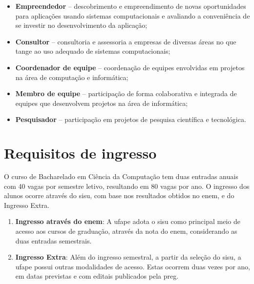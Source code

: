 \documentclass[
	12pt,				%
	openright,			%
  oneside,     %
	a4paper,			%
 hyphens,
	chapter=TITLE,		%
	english,			%
	french,				%
	spanish,			%
	brazil				%
	]{abntex2}
\begin{document}
\begin{itemize}
    \item \textbf{Empreendedor} – descobrimento e empreendimento de novas oportunidades para aplicações usando sistemas computacionais e avaliando a conveniência de se investir no desenvolvimento da aplicação;
    \item \textbf{Consultor} – consultoria e assessoria a empresas de diversas áreas no que tange ao uso adequado de sistemas computacionais;
    \item \textbf{Coordenador de equipe} – coordenação de equipes envolvidas em projetos na área de computação e informática;
    \item \textbf{Membro de equipe} – participação de forma colaborativa e integrada de equipes que desenvolvem projetos na área de informática;
    \item \textbf{Pesquisador} – participação em projetos de pesquisa científica e tecnológica. 
\end{itemize}




%
%


\chapter{Requisitos de ingresso}

O curso de Bacharelado em Ciência da Computação tem duas entradas anuais com 40 vagas por semestre letivo, resultando em 80 vagas por ano. O ingresso dos alunos ocorre através do \acrfull{sisu}, com base nos resultados obtidos no \acrfull{enem}, e do Ingresso Extra.

\begin{enumerate}
    \item \textbf{Ingresso através do \acrshort{enem}}: A \acrshort{ufape} adota o \acrshort{sisu} como principal meio de acesso aos cursos de graduação, através da nota do \acrshort{enem}, considerando as duas entradas semestrais.
    \item \textbf{Ingresso Extra}: Além do ingresso semestral, a partir da seleção do \acrshort{sisu}, a \acrshort{ufape} possui outras modalidades de acesso. Estas ocorrem duas vezes por ano, em datas previstas e com editais publicados pela \acrfull{preg}. 
\end{enumerate}
\end{document}
